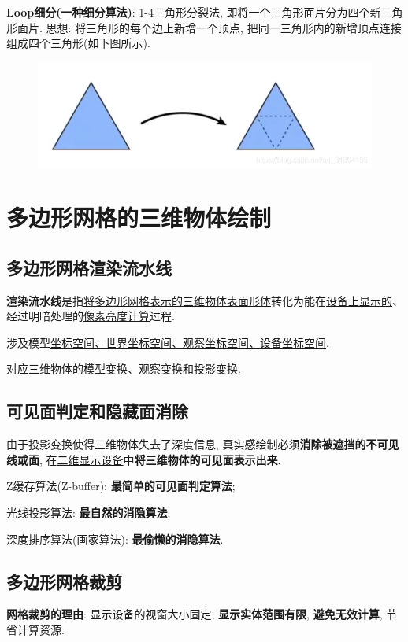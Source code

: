 \documentclass[12pt, a4paper, oneside]{ctexart}
\def\ul{\underline}         %
\def\bf{\textbf}            %
\begin{document}
\bf{Loop细分(一种细分算法)}: 1-4三角形分裂法, 即将一个三角形面片分为四个新三角形面片. 思想: 将三角形的每个边上新增一个顶点, 把同一三角形内的新增顶点连接组成四个三角形(如下图所示).

\begin{figure}[htbp]
    \centering
    \includegraphics[scale=0.4]{loop.png}
\end{figure}

\section{多边形网格的三维物体绘制}
\subsection{多边形网格渲染流水线}
\bf{渲染流水线}是指\ul{将多边形网格表示的三维物体表面形体}转化为能在\ul{设备上显示的}、经过明暗处理的\ul{像素亮度计算}过程.

涉及模型\ul{坐标空间、世界坐标空间、观察坐标空间、设备坐标空间}.

对应三维物体的\ul{模型变换、观察变换和投影变换}.

\subsection{可见面判定和隐藏面消除}
由于投影变换使得三维物体失去了深度信息, 真实感绘制必须\bf{消除被遮挡的不可见线或面}, 在\ul{二维显示设备}中\bf{将三维物体的可见面表示出来}.

Z缓存算法(Z-buffer): \bf{最简单的可见面判定算法};

光线投影算法: \bf{最自然的消隐算法};

深度排序算法(画家算法): \bf{最偷懒的消隐算法}.

\subsection{多边形网格裁剪}

\bf{网格裁剪的理由}: 显示设备的视窗大小固定, \bf{显示实体范围有限}, \bf{避免无效计算}, 节省计算资源.
\end{document}
